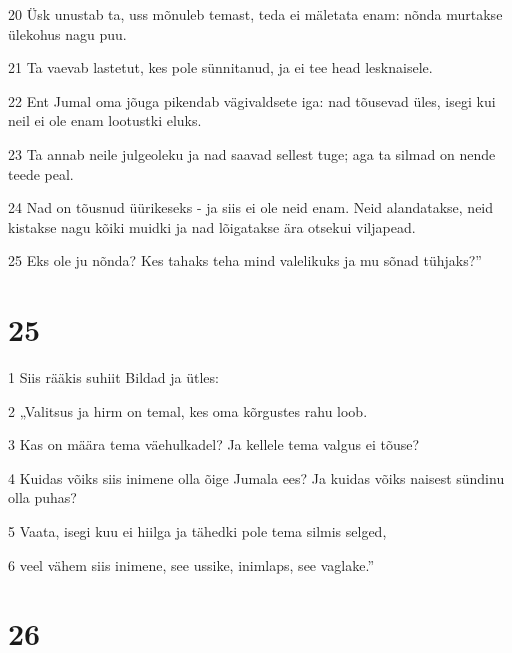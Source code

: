 \par 20 Üsk unustab ta, uss mõnuleb temast, teda ei mäletata enam: nõnda murtakse ülekohus nagu puu.
\par 21 Ta vaevab lastetut, kes pole sünnitanud, ja ei tee head lesknaisele.
\par 22 Ent Jumal oma jõuga pikendab vägivaldsete iga: nad tõusevad üles, isegi kui neil ei ole enam lootustki eluks.
\par 23 Ta annab neile julgeoleku ja nad saavad sellest tuge; aga ta silmad on nende teede peal.
\par 24 Nad on tõusnud üürikeseks - ja siis ei ole neid enam. Neid alandatakse, neid kistakse nagu kõiki muidki ja nad lõigatakse ära otsekui viljapead.
\par 25 Eks ole ju nõnda? Kes tahaks teha mind valelikuks ja mu sõnad tühjaks?”

\chapter{25}

\par 1 Siis rääkis suhiit Bildad ja ütles:
\par 2 „Valitsus ja hirm on temal, kes oma kõrgustes rahu loob.
\par 3 Kas on määra tema väehulkadel? Ja kellele tema valgus ei tõuse?
\par 4 Kuidas võiks siis inimene olla õige Jumala ees? Ja kuidas võiks naisest sündinu olla puhas?
\par 5 Vaata, isegi kuu ei hiilga ja tähedki pole tema silmis selged,
\par 6 veel vähem siis inimene, see ussike, inimlaps, see vaglake.”

\chapter{26}

